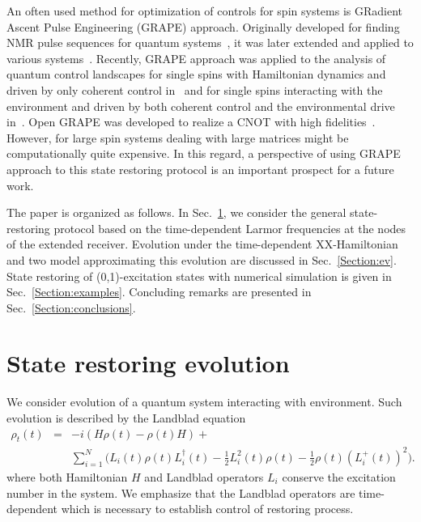 \documentclass[pra,preprint,showpacs]{revtex4-1}
\begin{document}
An often used method for optimization of controls for spin systems is GRadient Ascent Pulse Engineering (GRAPE) approach. {Originally developed for finding NMR pulse sequences for quantum systems}~\cite{Khaneja2005}, it was later extended and applied to various systems~\cite{GlaserJPB2011,Fouquieres2011,PechenTannor2011,Lucarelli2018,PP_2023}. Recently, GRAPE approach was applied to the analysis of quantum control landscapes for single spins with Hamiltonian dynamics and driven by only coherent control in~\cite{VMP_21} and for single spins interacting with the environment and driven by both coherent control and the environmental drive in~\cite{PP_2023}. Open GRAPE was developed to realize a CNOT with high fidelities~\cite{GlaserJPB2011}. However, for large spin systems dealing with large matrices might be computationally quite expensive. In this regard, a perspective of using GRAPE approach to this state restoring protocol is an important prospect for a future work.

The paper is organized as follows. In Sec.~\ref{Section:T}, we consider the general state-restoring protocol based on the time-dependent Larmor frequencies at the nodes of the extended receiver. Evolution under the time-dependent XX-Hamiltonian and two model approximating this evolution are discussed in Sec.~\ref{Section:ev}. State restoring of (0,1)-excitation states with numerical simulation is given in Sec.~\ref{Section:examples}. Concluding remarks are presented in Sec.~\ref{Section:conclusions}.

\fi

\section{State restoring evolution}
\label{Section:T}

We consider evolution of a quantum system interacting with 	environment. Such evolution is described by the  Landblad equation
\begin{eqnarray}\label{rho0}
 \rho_t(t)&=&-i (H\rho(t) - \rho(t) H) +\\\nonumber
&& \sum_{i=1}^N \Big(L_i(t) \rho(t) L_i^\dagger(t)
-\frac{1}{2} L_i^2(t)\rho(t) -\frac{1}{2} \rho(t) (L_i^+(t))^2\Big).
\end{eqnarray}
where both Hamiltonian $H$ and Landblad operators $L_i$ conserve the excitation number in the system. We emphasize that the Landblad operators are time-dependent which is necessary  to establish control of restoring process.
\end{document}
